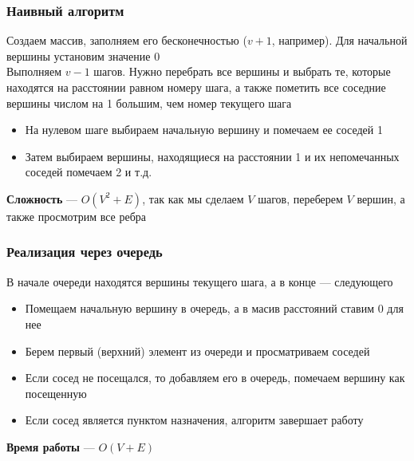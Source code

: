 \documentclass[a4paper]{article}
\begin{document}
\subsubsection*{Наивный алгоритм}
Создаем массив, заполняем его бесконечностью ($v+1$, например). Для начальной вершины установим значение 0\\[2mm]
\indent Выполняем $v-1$ шагов. Нужно перебрать все вершины и выбрать те, которые находятся на расстоянии равном номеру шага, а также пометить все соседние вершины числом на 1 большим, чем номер текущего шага
\begin{itemize}
    \item На нулевом шаге выбираем начальную вершину и помечаем ее соседей 1
    \item Затем выбираем вершины, находящиеся на расстоянии 1 и их непомечанных соседей помечаем 2 и т.д.
\end{itemize}
\indent \textbf{Сложность} — $O(V^2+E)$, так как мы сделаем $V$ шагов, переберем $V$ вершин, а также просмотрим все ребра
\subsubsection*{Реализация через очередь}
В начале очереди находятся вершины текущего шага, а в конце — следующего
\begin{itemize}
    \item Помещаем начальную вершину в очередь, а в масив расстояний ставим 0 для нее
    \item Берем первый (верхний) элемент из очереди и просматриваем соседей
    \item Если сосед не посещался, то добавляем его в очередь, помечаем вершину как посещенную
    \item Если сосед является пунктом назначения, алгоритм завершает работу
\end{itemize}
\indent\textbf{Время работы} — $O(V+E)$
\end{document}
